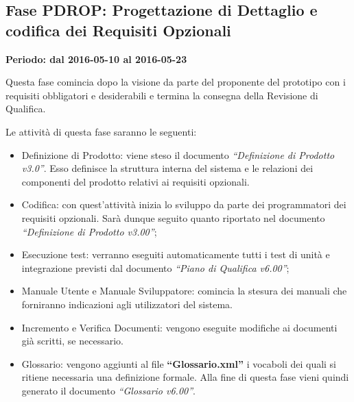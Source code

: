 \documentclass[../PianoProgetto.tex]{subfiles}
\begin{document}
	\subsection{Fase PDROP: Progettazione di Dettaglio e codifica dei Requisiti Opzionali}
		\textbf{Periodo: dal 2016-05-10 al 2016-05-23}
		
		Questa fase comincia dopo la visione da parte del proponente del prototipo con i requisiti obbligatori e desiderabili e termina la consegna della Revisione di Qualifica.

		Le attività di questa fase saranno le seguenti:
		\begin{itemize}
			\item Definizione di Prodotto: viene steso il documento \textit{“Definizione di Prodotto v3.0”}. Esso definisce la struttura interna del sistema e le relazioni dei componenti del prodotto relativi ai requisiti opzionali.

			\item Codifica: con quest’attività inizia lo sviluppo da parte dei programmatori dei requisiti opzionali. Sarà dunque seguito quanto riportato nel documento \textit{“Definizione di Prodotto v3.00”};

			\item Esecuzione test: verranno eseguiti automaticamente tutti i test di unità e integrazione previsti dal documento \textit{“Piano di Qualifica v6.00”};

			\item Manuale Utente e Manuale Sviluppatore: comincia la stesura dei manuali che forniranno indicazioni agli utilizzatori del sistema.

			\item Incremento e Verifica Documenti: vengono eseguite modifiche ai documenti già scritti, se necessario.
			
			\item Glossario: vengono aggiunti al file \textbf{“Glossario.xml”} i vocaboli dei quali si ritiene necessaria una definizione formale. Alla fine di questa fase vieni quindi generato il documento \textit{“Glossario v6.00”}.
		\end{itemize}
		
		
\end{document}
